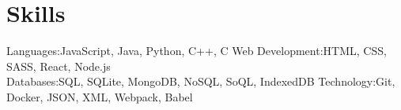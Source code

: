 \documentclass[]{resume-openfont}
\newcommand{\verticalspacing}[0]{\vspace{0.2cm}}
\begin{document}

\section{Skills}

\begin{skillList}
    \doubleItem
    {Languages:}{JavaScript, Java, Python, C++, C}
    {Web Development:}{HTML, CSS, SASS, React, Node.js}
    \\
    \doubleItem
    {Databases:}{SQL, SQLite, MongoDB, NoSQL, SoQL, IndexedDB}
    {Technology:}{Git, Docker, JSON, XML, Webpack, Babel}
\end{skillList}
\end{document}
